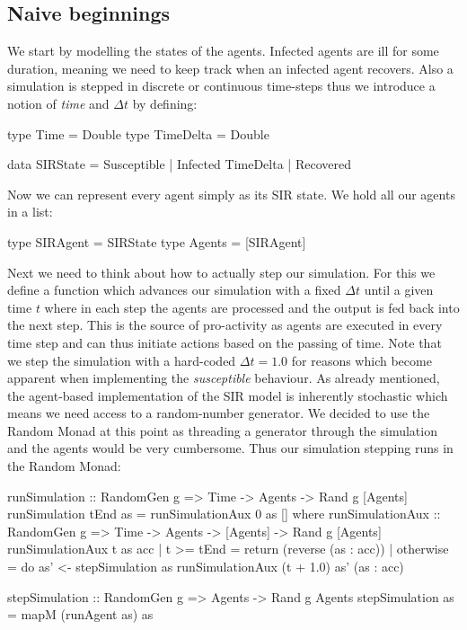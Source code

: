 \subsection{Naive beginnings}
\label{sec:naive_beginnigs}
We start by modelling the states of the agents. Infected agents are ill for some duration, meaning we need to keep track when an infected agent recovers. Also a simulation is stepped in discrete or continuous time-steps thus we introduce a notion of \textit{time} and $\Delta t$ by defining:

\begin{HaskellCode}
type Time      = Double
type TimeDelta = Double

data SIRState = Susceptible | Infected TimeDelta | Recovered
\end{HaskellCode}

Now we can represent every agent simply as its SIR state. We hold all our agents in a list:
\begin{HaskellCode}
type SIRAgent = SIRState
type Agents   = [SIRAgent]
\end{HaskellCode}

Next we need to think about how to actually step our simulation. For this we define a function which advances our simulation with a fixed $\Delta t$ until a given time $t$ where in each step the agents are processed and the output is fed back into the next step. This is the source of pro-activity as agents are executed in every time step and can thus initiate actions based on the passing of time. Note that we step the simulation with a hard-coded $\Delta t = 1.0$ for reasons which become apparent when implementing the \textit{susceptible} behaviour.
As already mentioned, the agent-based implementation of the SIR model is inherently stochastic which means we need access to a random-number generator. We decided to use the Random Monad at this point as threading a generator through the simulation and the agents would be very cumbersome. Thus our simulation stepping runs in the Random Monad:

\begin{HaskellCode}
runSimulation :: RandomGen g => Time -> Agents -> Rand g [Agents]
runSimulation tEnd as = runSimulationAux 0 as []
  where
    runSimulationAux :: RandomGen g 
      => Time -> Agents -> [Agents] -> Rand g [Agents]
    runSimulationAux t as acc
      | t >= tEnd = return (reverse (as : acc))
      | otherwise = do
        as' <- stepSimulation as 
        runSimulationAux (t + 1.0) as' (as : acc)

stepSimulation :: RandomGen g => Agents -> Rand g Agents
stepSimulation as = mapM (runAgent as) as
\end{HaskellCode}

